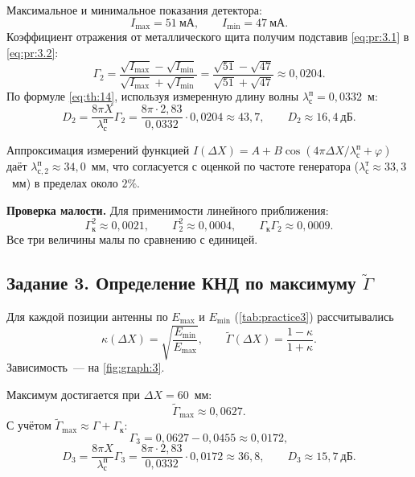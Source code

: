 Максимальное и минимальное показания детектора:
\begin{equation}
	I_{\max} = 51~\text{мА}, \qquad I_{\min} = 47~\text{мА}.
\end{equation}
Коэффициент отражения от металлического щита получим подставив \cref{eq:pr:3.1} в \cref{eq:pr:3.2}:
\begin{equation}
	\Gamma_2 = \frac{\sqrt{I_{\max}} - \sqrt{I_{\min}}}{\sqrt{I_{\max}} + \sqrt{I_{\min}}}
	= \frac{\sqrt{51} - \sqrt{47}}{\sqrt{51} + \sqrt{47}}
	\approx 0{,}0204.
	\label{eq:pr:2.1}
\end{equation}
По формуле \cref{eq:th:14}, используя измеренную длину волны ${\lambda^{\text{п}}_{\text{с}}} = 0{,}0332$~м:
\begin{equation}
	D_2 = \frac{8\pi X}{{\lambda^{\text{п}}_{\text{с}}}}\Gamma_2
	= \frac{8\pi \cdot 2{,}83}{0{,}0332} \cdot 0{,}0204
	\approx 43{,}7,
	\qquad
	D_2 \approx 16{,}4~\text{дБ}.
\end{equation}

Аппроксимация измерений функцией $I(\Delta X) = A + B\cos(4\pi\Delta X/{\lambda^{\text{п}}_{\text{с}}} + \varphi)$ даёт ${\lambda^{\text{п}}_{\text{с},2}} \approx 34{,}0$~мм, что согласуется с оценкой по частоте генератора (${\lambda^{\text{т}}_{\text{с}}} \approx 33{,}3$~мм) в пределах около $2\%$.

\noindent\textbf{Проверка малости.}
Для применимости линейного приближения:
\begin{equation}
	\Gamma_{\text{к}}^2 \approx 0{,}0021, \qquad
	\Gamma_2^2 \approx 0{,}0004, \qquad
	\Gamma_{\text{к}}\Gamma_2 \approx 0{,}0009.
\end{equation}
Все три величины малы по сравнению с единицей.

\subsection{Задание 3. Определение КНД по максимуму $\widetilde{\Gamma}$}

Для каждой позиции антенны по $E_{\max}$ и $E_{\min}$ (\cref{tab:practice3}) рассчитывались
\begin{equation}
	\kappa(\Delta X) = \sqrt{\frac{E_{\min}}{E_{\max}}},
	\qquad
	\widetilde{\Gamma}(\Delta X) = \frac{1 - \kappa}{1 + \kappa}.
\end{equation}
Зависимость~--- на \cref{fig:graph:3}.

Максимум достигается при $\Delta X = 60$~мм:
\begin{equation}
	\widetilde{\Gamma}_{\max} \approx 0{,}0627.
\end{equation}
С учётом $\widetilde{\Gamma}_{\max} \approx \Gamma + \Gamma_{\text{к}}$:
\begin{equation}
	\Gamma_3 = 0{,}0627 - 0{,}0455 \approx 0{,}0172,
\end{equation}
\begin{equation}
	D_3 = \frac{8\pi X}{{\lambda^{\text{п}}_{\text{с}}}}\Gamma_3
	= \frac{8\pi \cdot 2{,}83}{0{,}0332} \cdot 0{,}0172
	\approx 36{,}8,
	\qquad
	D_3 \approx 15{,}7~\text{дБ}.
\end{equation}

